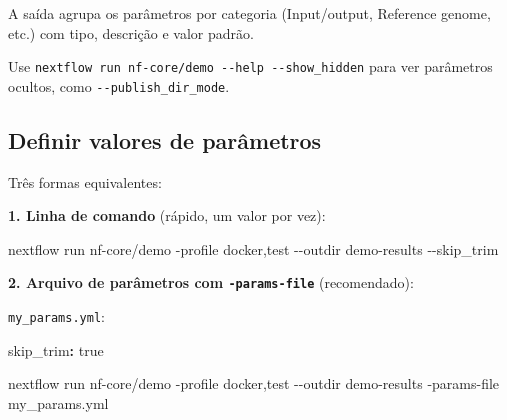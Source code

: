 \documentclass[
  brazilian,
  letterpaper,
  DIV=11,
  numbers=noendperiod]{scrreprt}
\newenvironment{Shaded}{\begin{snugshade}}{\end{snugshade}}
\newcommand{\AttributeTok}[1]{\textcolor[rgb]{0.40,0.45,0.13}{#1}}
\newcommand{\CharTok}[1]{\textcolor[rgb]{0.13,0.47,0.30}{#1}}
\newcommand{\ExtensionTok}[1]{\textcolor[rgb]{0.00,0.23,0.31}{#1}}
\newcommand{\FunctionTok}[1]{\textcolor[rgb]{0.28,0.35,0.67}{#1}}
\newcommand{\KeywordTok}[1]{\textcolor[rgb]{0.00,0.23,0.31}{\textbf{#1}}}
\newcommand{\NormalTok}[1]{\textcolor[rgb]{0.00,0.23,0.31}{#1}}
\begin{document}
A saída agrupa os parâmetros por categoria (Input/output, Reference
genome, etc.) com tipo, descrição e valor padrão.

\begin{tcolorbox}[enhanced jigsaw, arc=.35mm, bottomrule=.15mm, bottomtitle=1mm, breakable, colback=white, colbacktitle=quarto-callout-tip-color!10!white, colframe=quarto-callout-tip-color-frame, coltitle=black, left=2mm, leftrule=.75mm, opacityback=0, opacitybacktitle=0.6, rightrule=.15mm, title=\textcolor{quarto-callout-tip-color}{\faLightbulb}\hspace{0.5em}{Dica}, titlerule=0mm, toprule=.15mm, toptitle=1mm]

Use \texttt{nextflow\ run\ nf-core/demo\ -\/-help\ -\/-show\_hidden}
para ver parâmetros ocultos, como \texttt{-\/-publish\_dir\_mode}.

\end{tcolorbox}

\subsection{Definir valores de
parâmetros}\label{definir-valores-de-paruxe2metros}

Três formas equivalentes:

\textbf{1. Linha de comando} (rápido, um valor por vez):

\begin{Shaded}
\begin{Highlighting}[]
\ExtensionTok{nextflow}\NormalTok{ run nf{-}core/demo }\AttributeTok{{-}profile}\NormalTok{ docker,test }\AttributeTok{{-}{-}outdir}\NormalTok{ demo{-}results }\AttributeTok{{-}{-}skip\_trim}
\end{Highlighting}
\end{Shaded}

\textbf{2. Arquivo de parâmetros com \texttt{-params-file}}
(recomendado):

\texttt{my\_params.yml}:

\begin{Shaded}
\begin{Highlighting}[]
\FunctionTok{skip\_trim}\KeywordTok{:}\AttributeTok{ }\CharTok{true}
\end{Highlighting}
\end{Shaded}

\begin{Shaded}
\begin{Highlighting}[]
\ExtensionTok{nextflow}\NormalTok{ run nf{-}core/demo }\AttributeTok{{-}profile}\NormalTok{ docker,test }\AttributeTok{{-}{-}outdir}\NormalTok{ demo{-}results }\AttributeTok{{-}params{-}file}\NormalTok{ my\_params.yml}
\end{Highlighting}
\end{Shaded}
\end{document}
